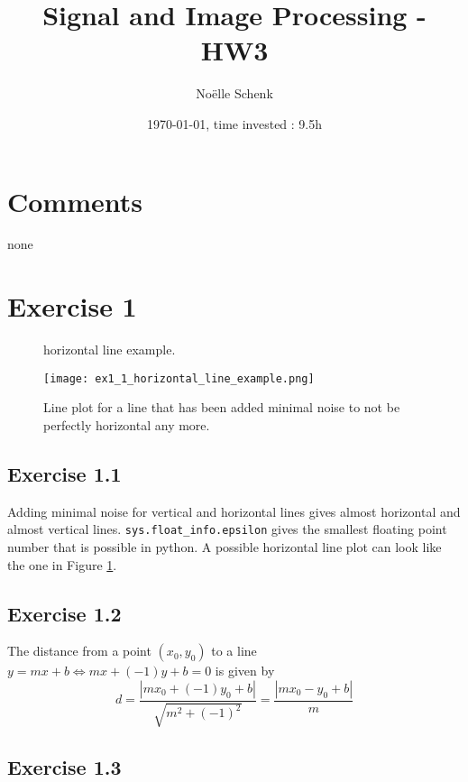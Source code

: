 \documentclass[a4paper,8pt]{extarticle}
\title{Signal and Image Processing - HW3}
\author{Noëlle Schenk}
\date{\today, time invested : 9.5h}
\begin{document}
\maketitle
\section{Comments}
none

\section{Exercise 1}
\begin{figure}
  \caption{horizontal line example.}
  \centering
    \texttt{[image: ex1\_1\_horizontal\_line\_example.png]}
  \label{fig:horizontal}
  \caption{Line plot for a line that has been added minimal noise to not be perfectly horizontal any more.}
\end{figure}

\subsection{Exercise 1.1}
Adding minimal noise for vertical and horizontal lines gives almost horizontal and almost vertical lines. \texttt{sys.float\_info.epsilon} gives the smallest floating point number that is possible in python. A possible horizontal line plot can look like the one in Figure \ref{fig:horizontal}. 

\subsection{Exercise 1.2}
The distance from a point $(x_0, y_0)$ to a line $y = mx + b \Leftrightarrow mx + (-1)y + b = 0$ is given by \[ d = \frac{| mx_0 + (-1) y_0 + b |}{\sqrt{m^2 + (-1)^2}} = \frac{|mx_0 - y_0 + b |}{m} \]



\subsection{Exercise 1.3}
\end{document}
